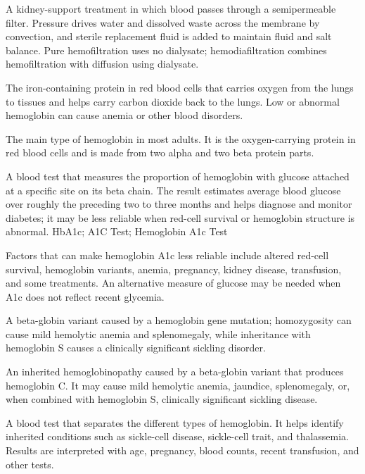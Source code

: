  A kidney-support treatment in which blood passes through a semipermeable filter. Pressure drives water and dissolved waste across the membrane by convection, and sterile replacement fluid is added to maintain fluid and salt balance. Pure hemofiltration uses no dialysate; hemodiafiltration combines hemofiltration with diffusion using dialysate.

 The iron-containing protein in red blood cells that carries oxygen from the lungs to tissues and helps carry carbon dioxide back to the lungs. Low or abnormal hemoglobin can cause anemia or other blood disorders.

 The main type of hemoglobin in most adults. It is the oxygen-carrying protein in red blood cells and is made from two alpha and two beta protein parts.

 A blood test that measures the proportion of hemoglobin with glucose attached at a specific site on its beta chain.
The result estimates average blood glucose over roughly the preceding two to three months
and helps diagnose and monitor diabetes;
it may be less reliable when red-cell survival or hemoglobin structure is abnormal.
\synonyms
HbA1c; A1C Test; Hemoglobin A1c Test

 Factors that can make hemoglobin A1c less reliable include altered red-cell survival, hemoglobin variants, anemia,
pregnancy, kidney disease, transfusion, and some treatments. An alternative measure of
glucose may be needed when A1c does not reflect recent glycemia.

 A beta-globin variant caused by a hemoglobin gene mutation; homozygosity can cause mild hemolytic anemia and splenomegaly, while inheritance with hemoglobin S causes a clinically significant sickling disorder.

 An inherited hemoglobinopathy caused by a beta-globin variant that produces hemoglobin
C. It may cause mild hemolytic anemia, jaundice, splenomegaly, or, when combined with
hemoglobin S, clinically significant sickling disease.

 A blood test that separates the different types of hemoglobin. It helps identify inherited conditions such as sickle-cell disease, sickle-cell trait, and thalassemia. Results are interpreted with age, pregnancy, blood counts, recent transfusion, and other tests.

